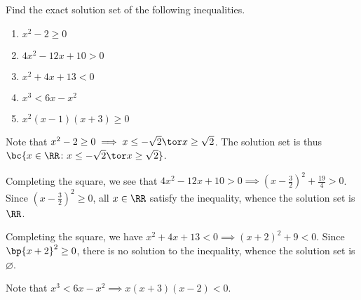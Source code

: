 \begin{problem}
    Find the exact solution set of the following inequalities.

    \begin{enumerate}
        \item $x^2 - 2 \geq 0$
        \item $4x^2 - 12x + 10 > 0$
        \item $x^2 + 4x + 13 < 0$
        \item $x^3 < 6x - x^2$
        \item $x^2(x-1)(x+3) \geq 0$
    \end{enumerate}
\end{problem}
\begin{solution}
    \begin{ppart}
        Note that $x^2 - 2 \geq 0 \implies x \leq -\sqrt{2} \tor x \geq \sqrt{2}$. The solution set is thus $\bc{x \in \RR \colon x \leq -\sqrt2 \tor x \geq \sqrt2}$.
    \end{ppart}
    \begin{ppart}
        Completing the square, we see that $4x^2 - 12x + 10 > 0 \implies (x-\frac32)^2 + \frac{19}4 > 0$. Since $(x-\frac32)^2 \geq 0$, all $x \in \RR$ satisfy the inequality, whence the solution set is $\RR$.
    \end{ppart}
    \begin{ppart}
        Completing the square, we have $x^2 + 4x + 13 < 0 \implies (x+2)^2 + 9 < 0$. Since $\bp{x+2}^2 \geq 0$, there is no solution to the inequality, whence the solution set is $\varnothing$.
    \end{ppart}
    \begin{ppart}
        Note that $x^3 < 6x - x^2 \implies x(x+3)(x-2) < 0$.
        \begin{center}
\end{center}
\end{ppart}
\end{solution}
